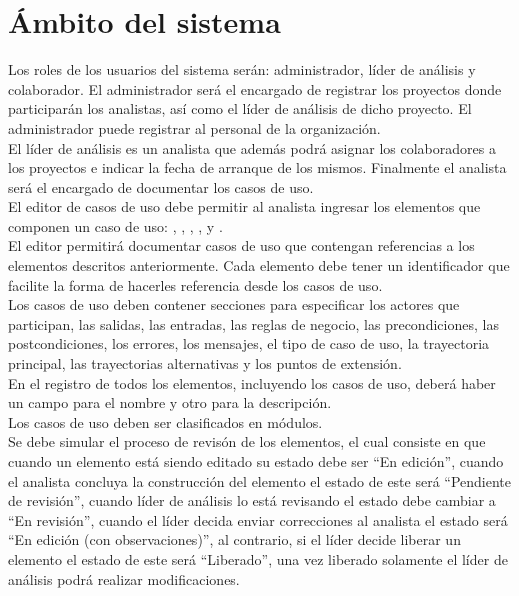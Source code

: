\section{Ámbito del sistema}
Los roles de los usuarios del sistema serán: administrador, líder de análisis y colaborador. El administrador será el encargado 
de registrar los proyectos donde participarán los analistas, así como el líder de análisis de dicho proyecto. El administrador puede
registrar al personal de la organización.\\

El líder de análisis es un analista que además podrá asignar los colaboradores a los proyectos e indicar la fecha de arranque de los mismos. Finalmente
el analista será el encargado de documentar los casos de uso.\\

El editor de casos de uso debe permitir al analista ingresar los elementos que componen un caso de uso: , , 
, ,  y .\\

El editor permitirá documentar casos de uso que contengan referencias a los elementos descritos anteriormente.
Cada elemento debe tener un identificador que facilite la forma de hacerles referencia desde los casos de uso.\\

Los casos de uso deben contener secciones para especificar los actores que participan, las salidas, las entradas, las reglas de negocio,
las precondiciones, las postcondiciones, los errores, los mensajes, el tipo de
caso de uso, la trayectoria principal, las trayectorias alternativas y los puntos de extensión.\\

En el registro de todos los elementos, incluyendo los casos de uso, deberá haber un campo para el nombre y otro para la descripción.\\

Los casos de uso deben ser clasificados en módulos.\\

Se debe simular el proceso de revisón de los elementos, el cual consiste en que cuando un elemento está siendo editado su estado debe ser ``En edición'', cuando 
el analista concluya la construcción del elemento el estado de este será ``Pendiente de revisión'', cuando líder de análisis lo está revisando el estado 
debe cambiar a ``En revisión'', cuando el líder decida enviar correcciones al analista el estado será ``En edición (con observaciones)'', al contrario, 
si el líder decide liberar un elemento el estado de este será ``Liberado'', una vez liberado solamente el líder de análisis podrá realizar modificaciones.\\

